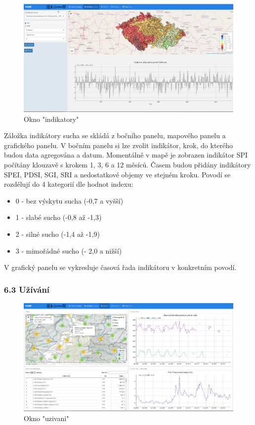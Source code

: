 \documentclass[12pt,]{article}
\providecommand{\tightlist}{%
  \setlength{\itemsep}{0pt}\setlength{\parskip}{0pt}}
\begin{document}
\begin{figure}[H]
      \includegraphics[width=\textwidth]{fig/P_indikatory}
      \caption{Okno "indikatory"}
      \label{fig:ch5.4}
\end{figure}

Záložka indikátory sucha se skládá z bočního panelu, mapového panelu a
grafického panelu. V bočním panelu si lze zvolit indikátor, krok, do
kterého budou data agregována a datum. Momentálně v mapě je zobrazen
indikátor SPI počítány klouzavě s krokem 1, 3, 6 a 12 měsíců. Časem
budou přidány indikátory SPEI, PDSI, SGI, SRI a nedostatkové objemy ve
stejném kroku. Povodí se rozdělují do 4 kategorií dle hodnot indexu:

\begin{itemize}
\tightlist
\item
  0 - bez výskytu sucha (-0,7 a vyšší)
\item
  1 - slabé sucho (-0,8 až -1,3)
\item
  2 - silné sucho (-1,4 až -1,9)
\item
  3 - mimořádné sucho (- 2,0 a nižší)
\end{itemize}

V grafický panelu se vykresluje časová řada indikátoru v konkretním
povodí.

\subsubsection{6.3 Užívání}\label{uzivani}

\begin{figure}[H]
      \includegraphics[width=\textwidth]{fig/P_uzivani}
      \caption{Okno "uzivani"}
      \label{fig:ch5.5}
\end{figure}
\end{document}
